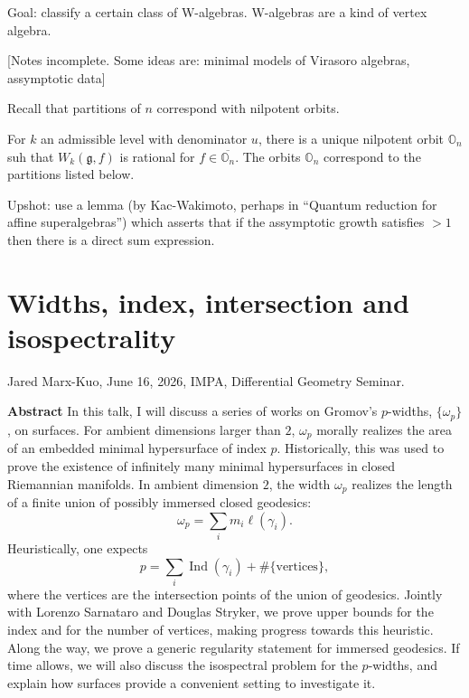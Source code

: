 \medskip\noindent
Goal: classify a certain class of W-algebras.
W-algebras are a kind of vertex algebra.

[Notes incomplete.
Some ideas are: minimal models
of Virasoro algebras,
assymptotic data]

\medskip\noindent
Recall that partitions of $n$
correspond with nilpotent orbits.

\begin{theorem}[Arakawa, 2015]
\label{theorem-arakawa}
For $k$ an admissible level with
denominator $u$, there is a unique
nilpotent orbit $\mathbb{O}_n$
suh that $W_k(\mathfrak{g},f)$
is rational for $f \in \overline{
\mathbb{O}_n}$. The orbits $\mathbb{O}_n$
correspond to the partitions listed below.
\end{theorem}

\medskip\noindent
Upshot: use a lemma 
(by Kac-Wakimoto, perhaps in
``Quantum reduction
for affine superalgebras'') which asserts
that if the assymptotic growth
satisfies $>1$ then there is a direct
sum expression.

\section{Widths, index, intersection
and isospectrality}
\label{section-widths-index-intersection}

\noindent
Jared Marx-Kuo, June 16, 2026,
IMPA, Differential Geometry Seminar.

\medskip\noindent
{\bf Abstract}
In this talk, I will discuss a series of
works on Gromov's $p$-widths,
$\{\omega_p\}$, on surfaces.
For ambient dimensions larger than $2$,
$\omega_p$ morally realizes the area of
an embedded minimal hypersurface of
index $p$. Historically, this was used
to prove the existence of infinitely
many minimal hypersurfaces in closed
Riemannian manifolds.
In ambient dimension $2$, the width
$\omega_p$ realizes the length of a
finite union of possibly immersed
closed geodesics:
$$
\omega_p
=
\sum_i m_i \ell(\gamma_i).
$$
Heuristically, one expects
$$
p
=
\sum_i \operatorname{Ind}(\gamma_i)
+
\#\{\text{vertices}\},
$$
where the vertices are the intersection
points of the union of geodesics.
Jointly with Lorenzo Sarnataro and
Douglas Stryker, we prove upper bounds
for the index and for the number of
vertices, making progress towards this
heuristic. Along the way, we prove a
generic regularity statement for
immersed geodesics.
If time allows, we will also discuss
the isospectral problem for the
$p$-widths, and explain how surfaces
provide a convenient setting to
investigate it.



